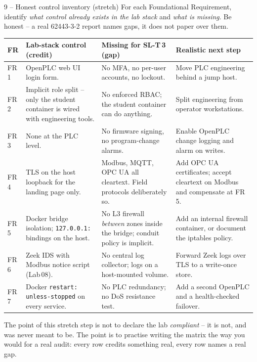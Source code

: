 \documentclass[11pt,a4paper]{article}
\begin{document}
\begin{stepbox}{9 -- Honest control inventory (stretch)}
For each Foundational Requirement, identify \emph{what control already exists in the lab stack} and \emph{what is missing}. Be honest -- a real 62443-3-2 report names gaps, it does not paper over them.
\medskip

\noindent\small
\begin{tabular}{@{}p{} p{} p{} p{}@{}}
\toprule
\textbf{FR} & \textbf{Lab-stack control (credit)} & \textbf{Missing for SL-T\,3 (gap)} & \textbf{Realistic next step} \\
\midrule
FR\,1 & OpenPLC web UI login form.                              & No MFA, no per-user accounts, no lockout. & Move PLC engineering behind a jump host. \\
FR\,2 & Implicit role split -- only the student container is wired with engineering tools. & No enforced RBAC; the student container can do anything. & Split engineering from operator workstations. \\
FR\,3 & None at the PLC level.                                   & No firmware signing, no program-change alarms. & Enable OpenPLC change logging and alarm on writes. \\
FR\,4 & TLS on the host loopback for the landing page only.      & Modbus, MQTT, OPC UA all cleartext. Field protocols deliberately so. & Add OPC UA certificates; accept cleartext on Modbus and compensate at FR\,5. \\
FR\,5 & Docker bridge isolation; \texttt{127.0.0.1:} bindings on the host. & No L3 firewall \emph{between} zones inside the bridge; conduit policy is implicit. & Add an internal firewall container, or document the iptables policy. \\
FR\,6 & Zeek IDS with Modbus notice script (Lab\,08).             & No central log collector; logs on a host-mounted volume. & Forward Zeek logs over TLS to a write-once store. \\
FR\,7 & Docker \texttt{restart: unless-stopped} on every service. & No PLC redundancy; no DoS resistance test. & Add a second OpenPLC and a health-checked failover. \\
\bottomrule
\end{tabular}
\medskip

The point of this stretch step is not to declare the lab \emph{compliant} -- it is not, and was never meant to be. The point is to practise writing the matrix the way you would for a real audit: every row credits something real, every row names a real gap.
\end{stepbox}
\end{document}
